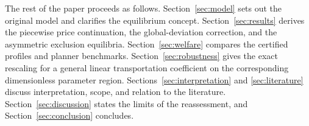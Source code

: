The rest of the paper proceeds as follows. Section~\ref{sec:model} sets out the original model and clarifies the equilibrium concept. Section~\ref{sec:results} derives the piecewise price continuation, the global-deviation correction, and the asymmetric exclusion equilibria. Section~\ref{sec:welfare} compares the certified profiles and planner benchmarks. Section~\ref{sec:robustness} gives the exact rescaling for a general linear transportation coefficient on the corresponding dimensionless parameter region. Sections~\ref{sec:interpretation} and \ref{sec:literature} discuss interpretation, scope, and relation to the literature. Section~\ref{sec:discussion} states the limits of the reassessment, and Section~\ref{sec:conclusion} concludes.
